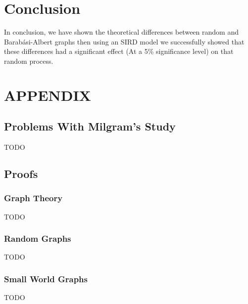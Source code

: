 \documentclass{article}
\begin{document}
    \section{Conclusion}
    In conclusion, we have shown the theoretical differences between random and Barabási-Albert graphs then using an SIRD model we successfully showed that these differences had a significant effect (At a 5\% significance level) on that random process.

    \section{APPENDIX}
        \subsection{Problems With Milgram's Study}
        TODO
        \subsection{Proofs}
            \subsubsection{Graph Theory}
            TODO
            \subsubsection{Random Graphs}
            TODO
            \subsubsection{Small World Graphs}
            TODO
\end{document}
